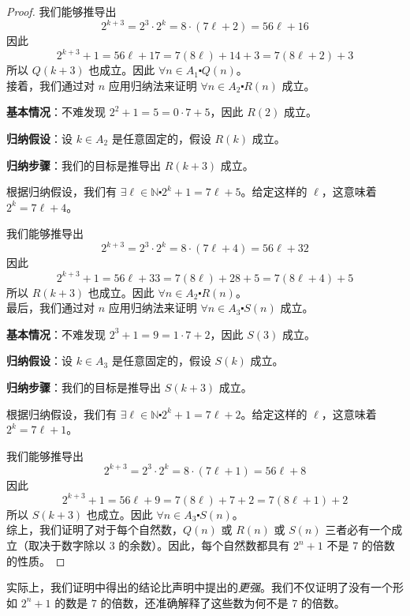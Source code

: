 \begin{proof}
    我们能够推导出
    \[2^{k+3} = 2^3 \cdot 2^k = 8 \cdot (7\ell + 2) = 56\ell + 16\]
    因此
    \[2^{k+3} + 1 = 56\ell + 17 = 7(8\ell) + 14 + 3 = 7(8\ell + 2) + 3\]
    所以 $Q(k + 3)$ 也成立。因此 $\forall n \in A_1 \centerdot Q(n)$。\\

    接着，我们通过对 $n$ 应用归纳法来证明 $\forall n \in A_2 \centerdot R(n)$ 成立。

    \textbf{基本情况}：不难发现 $2^2+1=5 = 0 \cdot 7 + 5$，因此 $R(2)$ 成立。

    \textbf{归纳假设}：设 $k \in A_2$ 是任意固定的，假设 $R(k)$ 成立。

    \textbf{归纳步骤}：我们的目标是推导出 $R(k+3)$ 成立。

    根据归纳假设，我们有 $\exists \ell \in \mathbb{N} \centerdot 2^k + 1 = 7\ell + 5$。给定这样的 $\ell$，这意味着 $2^k = 7\ell + 4$。

    我们能够推导出
    \[2^{k+3} = 2^3 \cdot 2^k = 8 \cdot (7\ell + 4) = 56\ell + 32\]
    因此
    \[2^{k+3} + 1 = 56\ell + 33 = 7(8\ell) + 28 + 5 = 7(8\ell + 4) + 5\]
    所以 $R(k + 3)$ 也成立。因此 $\forall n \in A_2 \centerdot R(n)$。\\

    最后，我们通过对 $n$ 应用归纳法来证明 $\forall n \in A_3 \centerdot S(n)$ 成立。

    \textbf{基本情况}：不难发现 $2^3+1=9 = 1 \cdot 7 + 2$，因此 $S(3)$ 成立。

    \textbf{归纳假设}：设 $k \in A_3$ 是任意固定的，假设 $S(k)$ 成立。

    \textbf{归纳步骤}：我们的目标是推导出 $S(k+3)$ 成立。

    根据归纳假设，我们有 $\exists \ell \in \mathbb{N} \centerdot 2^k + 1 = 7\ell + 2$。给定这样的 $\ell$，这意味着 $2^k = 7\ell + 1$。

    我们能够推导出
    \[2^{k+3} = 2^3 \cdot 2^k = 8 \cdot (7\ell + 1) = 56\ell + 8\]
    因此
    \[2^{k+3} + 1 = 56\ell + 9 = 7(8\ell) + 7 + 2 = 7(8\ell + 1) + 2\]
    所以 $S(k + 3)$ 也成立。因此 $\forall n \in A_3 \centerdot S(n)$。\\

    综上，我们证明了对于每个自然数，$Q(n)$ 或 $R(n)$ 或 $S(n)$ 三者必有一个成立（取决于数字除以 $3$ 的余数）。因此，每个自然数都具有 $2^n + 1$ 不是 $7$ 的倍数的性质。
\end{proof}

实际上，我们证明中得出的结论比声明中提出的\emph{更强}。我们不仅证明了没有一个形如 $2^n + 1$ 的数是 $7$ 的倍数，还准确解释了这些数为何不是 $7$ 的倍数。

